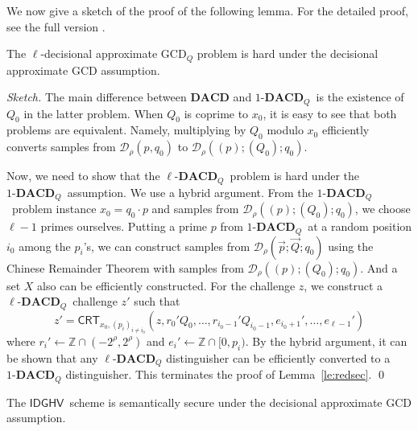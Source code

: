 \documentclass{llncs}
\newcommand{\Z}{{\mathbb Z}}
\newcommand*{\crt}{\ensuremath{\mathsf{CRT}}}
\newcommand*{\CDGHV}{\ensuremath{\mathsf{IDGHV}}}
\newcommand*{\lDACD}{\ensuremath{\ell\textbf{-}\mathbf{DACD}_Q}}
\newcommand*{\DACD}{\ensuremath{1\textbf{-}\mathbf{DACD}_Q}}
\newcommand*\D{\ensuremath{\mathcal D}}
\begin{document}
We now give a sketch of the proof of the following lemma. For the detailed proof, see the full version \cite{KLYC2013}. 
\begin{lemma}
\label{le:redsec}
The $\ell$-decisional approximate GCD$_Q$ problem is hard under the
decisional approximate GCD assumption.
\end{lemma}
\begin{proof}[Sketch] The main difference between $\mathbf{DACD}$ and \DACD\  is the existence of $Q_0$ in the latter problem. When $Q_0$ is coprime to $x_0$, it is easy to see that both problems are equivalent. Namely, multiplying by $Q_0$ modulo $x_0$ efficiently converts samples from $\D_\rho(p,q_0)$ to $\D_\rho((p); (Q_0); q_0)$. 

Now, we need to show that the \lDACD\ problem is hard under the
\DACD\ assumption. We use a hybrid argument. From the
\DACD\ problem instance $x_0=q_0\cdot p$ and samples from $\D_\rho((p);
(Q_0); q_0)$, we choose $\ell-1$ primes ourselves. Putting a prime $p$
from \DACD\ at a random position $i_0$ among the $p_i$'s, we can
construct samples from $\D_{\rho}(\vec{p};\vec{Q};q_0)$ using the Chinese
Remainder Theorem with samples from $\D_\rho((p); (Q_0); q_0)$. And a set
$X$ also can be efficiently constructed. For the challenge $z$, we
construct a \lDACD\  challenge $z'$ such that  
\begin{equation*}
z'=\crt_{x_0,(p_i)_{i\neq i_0}}(z,r_{0}'Q_0,\dots,r_{i_0-1}'Q_{i_0-1},e_{i_0+1}',\dots,e_{\ell-1}') 
\end{equation*}
where $r_i'\gets\Z\cap (-2^\rho,2^\rho)$ and
$e_i'\gets\Z\cap[0,p_i)$. By the hybrid argument, it can be shown that
  any $\lDACD$ distinguisher can be efficiently converted to a $\DACD$
  distinguisher. This terminates the proof of Lemma~\ref{le:redsec}. 
\qed
\end{proof}
\begin{corollary}
The \CDGHV \ scheme is semantically secure under the
decisional approximate GCD assumption.
\end{corollary}
\end{document}
